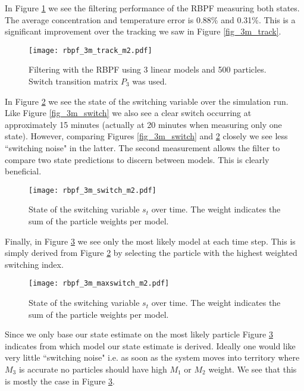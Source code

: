 In Figure \ref{fig_3m_track_m2} we see the filtering performance of the RBPF measuring both states. The average concentration and temperature error is 0.88\% and 0.31\%. This is a significant improvement over the tracking we saw in Figure \ref{fig_3m_track}.
\begin{figure}[H] 
\centering
\texttt{[image: rbpf\_3m\_track\_m2.pdf]}
\caption{Filtering with the RBPF using 3 linear models and 500 particles. Switch transition matrix $P_3$ was used.}
\label{fig_3m_track_m2}
\end{figure}
In Figure \ref{fig_3m_switch_m2} we see the state of the switching variable over the simulation run. Like Figure \ref{fig_3m_switch} we also see a clear switch occurring at approximately 15 minutes (actually at 20 minutes when measuring only one state). However, comparing Figures \ref{fig_3m_switch} and \ref{fig_3m_switch_m2} closely we see less ``switching noise" in the latter. The second measurement allows the filter to compare two state predictions to discern between models. This is clearly beneficial.
\begin{figure}[H] 
\centering
\texttt{[image: rbpf\_3m\_switch\_m2.pdf]}
\caption{State of the switching variable $s_t$ over time. The weight indicates the sum of the particle weights per model.}
\label{fig_3m_switch_m2}
\end{figure}
Finally, in Figure \ref{fig_3m_maxswitch} we see only the most likely model at each time step. This is simply derived from Figure \ref{fig_3m_switch_m2} by selecting the particle with the highest weighted switching index.
\begin{figure}[H] 
\centering
\texttt{[image: rbpf\_3m\_maxswitch\_m2.pdf]}
\caption{State of the switching variable $s_t$ over time. The weight indicates the sum of the particle weights per model.}
\label{fig_3m_maxswitch}
\end{figure}
Since we only base our state estimate on the most likely particle Figure \ref{fig_3m_maxswitch} indicates from which model our state estimate is derived. Ideally one would like very little ``switching noise" i.e. as soon as the system moves into territory where $M_3$ is accurate no particles should have high $M_1$ or $M_2$ weight. We see that this is mostly the case in Figure \ref{fig_3m_maxswitch}. 